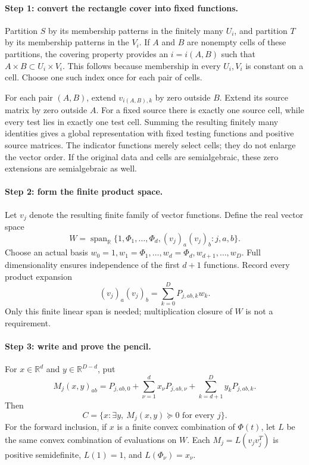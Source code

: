 \paragraph{Step 1: convert the rectangle cover into fixed functions.}
Partition $S$ by its membership patterns in the finitely many $U_i$,
and partition $T$ by its membership patterns in the $V_i$. If $A$ and
$B$ are nonempty cells of these partitions, the covering property
provides an $i=i(A,B)$ such that $A\times B\subset U_i\times V_i$.
This follows because membership in every $U_i,V_i$ is constant on a
cell. Choose one such index once for each pair of cells.

For each pair $(A,B)$, extend $v_{i(A,B),k}$ by zero outside $B$.
Extend its source matrix by zero outside $A$. For a fixed source
there is exactly one source cell, while every test lies in exactly
one test cell. Summing the resulting finitely many identities gives
a global representation with fixed testing functions and positive
source matrices. The indicator functions merely select cells; they
do not enlarge the vector order. If the original data and cells are
semialgebraic, these zero extensions are semialgebraic as well.

\paragraph{Step 2: form the finite product space.}
Let $v_j$ denote the resulting finite family of vector functions.
Define the real vector space
\[
 W=\operatorname{span}_{\mathbb R}
 \{1,\Phi_1,\ldots,\Phi_d,(v_j)_a(v_j)_b:j,a,b\}.
\]
Choose an actual basis
$w_0=1,w_1=\Phi_1,\ldots,w_d=\Phi_d,w_{d+1},\ldots,w_D$.
Full dimensionality ensures independence of the first $d+1$
functions. Record every product expansion
\[
 (v_j)_a(v_j)_b=\sum_{k=0}^{D}P_{j,ab,k}w_k.
\]
Only this finite linear span is needed; multiplication closure of
$W$ is not a requirement.

\paragraph{Step 3: write and prove the pencil.}
For $x\in\mathbb R^d$ and $y\in\mathbb R^{D-d}$, put
\begin{equation}
 M_j(x,y)_{ab}=P_{j,ab,0}
       +\sum_{\nu=1}^{d}x_\nu P_{j,ab,\nu}
       +\sum_{k=d+1}^{D}y_kP_{j,ab,k}.
 \label{eq:finite-cover-pencil}
\end{equation}
Then
\[
 C=\{x:\exists y,\ M_j(x,y)\succeq0\text{ for every }j\}.
\]
For the forward inclusion, if $x$ is a finite convex combination of
$\Phi(t)$, let $L$ be the same convex combination of evaluations on
$W$. Each $M_j=L(v_jv_j^T)$ is positive semidefinite, $L(1)=1$, and
$L(\Phi_\nu)=x_\nu$.

